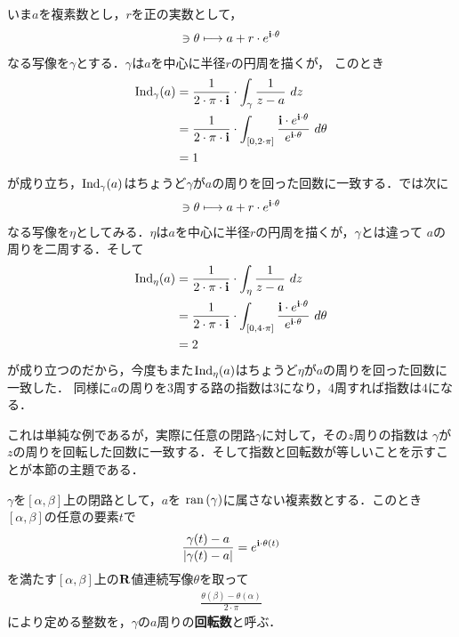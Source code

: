 	いま$a$を複素数とし，$r$を正の実数として，
	\begin{align}
		[0,2 \cdot \pi] \ni \theta \longmapsto a + r \cdot e^{\isym \cdot \theta}
	\end{align}
	なる写像を$\gamma$とする．$\gamma$は$a$を中心に半径$r$の円周を描くが，
	このとき
	\begin{align}
		\Ind_{\gamma}(a) 
		&= \frac{1}{2\cdot\pi\cdot\isym} \cdot \int_{\gamma} \frac{1}{z-a}\ dz \\
		&= \frac{1}{2\cdot\pi\cdot\isym} \cdot \int_{[0,2\cdot\pi]} \frac{\isym \cdot e^{\isym \cdot \theta}}{e^{\isym \cdot \theta}}\ d\theta \\
		&= 1
	\end{align}
	が成り立ち，$\operatorname{Ind}_{\gamma}(a)$はちょうど$\gamma$が$a$の周りを回った回数に一致する．では次に
	\begin{align}
		[0,4 \cdot \pi] \ni \theta \longmapsto a + r \cdot e^{\isym \cdot \theta}
	\end{align}
	なる写像を$\eta$としてみる．$\eta$は$a$を中心に半径$r$の円周を描くが，$\gamma$とは違って
	$a$の周りを二周する．そして
	\begin{align}
		\Ind_{\eta}(a) 
		&= \frac{1}{2\cdot\pi\cdot\isym} \cdot \int_{\eta} \frac{1}{z-a}\ dz \\
		&= \frac{1}{2\cdot\pi\cdot\isym} \cdot \int_{[0,4\cdot\pi]} \frac{\isym \cdot e^{\isym \cdot \theta}}{e^{\isym \cdot \theta}}\ d\theta \\
		&= 2
	\end{align}
	が成り立つのだから，今度もまた$\operatorname{Ind}_{\eta}(a)$はちょうど$\eta$が$a$の周りを回った回数に一致した．
	同様に$a$の周りを$3$周する路の指数は$3$になり，$4$周すれば指数は$4$になる．
	
	これは単純な例であるが，実際に任意の閉路$\gamma$に対して，その$z$周りの指数は
	$\gamma$が$z$の周りを回転した回数に一致する．そして指数と回転数が等しいことを示すことが本節の主題である．
	
	\begin{screen}
		\begin{dfn}[回転数]
			$\gamma$を$[\alpha,\beta]$上の閉路として，$a$を
			$\operatorname*{ran} \left(\gamma\right)$に属さない複素数とする．このとき$[\alpha,\beta]$の任意の要素$t$で
			\begin{align}
				\frac{\gamma(t) - a}{|\gamma(t) - a|} = e^{\mathbf{i}\cdot\theta(t)}
			\end{align}
			を満たす$[\alpha,\beta]$上の$\mathbf{R}$値連続写像$\theta$を取って
			\begin{align}
				\frac{\theta(\beta) - \theta(\alpha)}{2\cdot\pi}
			\end{align}
			により定める整数を，$\gamma$の$a$周りの{\bf 回転数}と呼ぶ．
		\end{dfn}
	\end{screen}